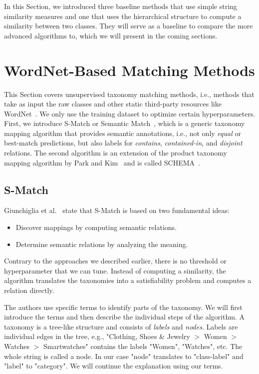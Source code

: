 In this Section, we introduced three baseline methods that use simple string similarity measures and one that
uses the hierarchical structure to compute a similarity between two classes.
They will serve as a baseline to compare the more advanced algorithms to, which we will present in the coming
sections.

\section{WordNet-Based Matching Methods}
\label{sec:unsupervised-taxo-match}

This Section covers unsupervised taxonomy matching methods, i.e., methods that take as input the raw classes
and other static third-party resources like WordNet~\cite{miller1995wordnet}.
We only use the training dataset to optimize certain hyperparameters.
First, we introduce S-Match or Semantic Match~\cite{giunchiglia2005semantic}, which is a generic taxonomy
mapping algorithm that provides semantic annotations, i.e., not only \emph{equal} or best-match predictions,
but also labels for \emph{contains}, \emph{contained-in}, and \emph{disjoint} relations.
The second algorithm is an extension of the product taxonomy mapping algorithm by Park and Kim~\cite{park2007ontology}
and is called SCHEMA~\cite{aanen2012schema}.

\subsection{S-Match}
\label{subsec:smatch}

Giunchiglia et al.\@~\cite{giunchiglia2005semantic} state that S-Match is based on two fundamental ideas:
\begin{itemize}
    \item Discover mappings by computing semantic relations.
    \item Determine semantic relations by analyzing the meaning.
\end{itemize}
Contrary to the approaches we described earlier, there is no threshold or hyperparameter that we can tune.
Instead of computing a similarity, the algorithm translates the taxonomies into a satisfiability problem
and computes a relation directly.

The authors use specific terms to identify parts of the taxonomy.
We will first introduce the terms and then describe the individual steps of the algorithm.
A taxonomy is a tree-like structure and consists of \emph{labels} and \emph{nodes}.
Labels are individual edges in the tree, e.g.,
"Clothing, Shoes \& Jewelry $>$ Women $>$ Watches $>$ Smartwatches" contains the labels
"Women", "Watches", etc.
The whole string is called a node.
In our case "node" translates to "class-label" and "label" to "category".
We will continue the explanation using our terms.

